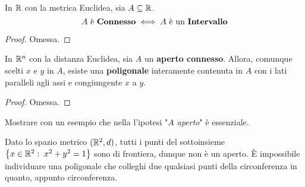 \begin{proposition}
	In $\mathbb{R}$ con la metrica Euclidea, sia $A \subseteq \mathbb{R}$.
	\[A \text{ è \textbf{Connesso}} \iff A \text{ è un \textbf{Intervallo}}\]
	\begin{proof}
		Omessa.
	\end{proof}
\end{proposition}
\begin{proposition}
	\label{prop:polig_in_aperto_connesso}
	In $\mathbb{R}^n$ con la distanza Euclidea, sia $A$ un \textbf{aperto connesso}. Allora, comunque scelti $x$ e $y$ in $A$, esiste una \textbf{poligonale} interamente contenuta in $A$ con i lati paralleli agli assi e congiungente $x$ a $y$.
	\begin{proof}
		Omessa.
	\end{proof}
\end{proposition}
\begin{exercise}
	Mostrare con un esempio che nella  l'ipotesi "\textit{$A$ aperto}" è essenziale.
	\begin{solution}
		Dato lo spazio metrico $(\mathbb{R}^2,d)$, tutti i punti del sottoinsieme $\left\{x \in \mathbb{R}^2:\;x^2 + y^2 = 1\right\}$ sono di frontiera, dunque non è un aperto. È impossibile individuare una poligonale che colleghi due qualsiasi punti della circonferenza in quanto, appunto circonferenza.
	\end{solution}
\end{exercise}

